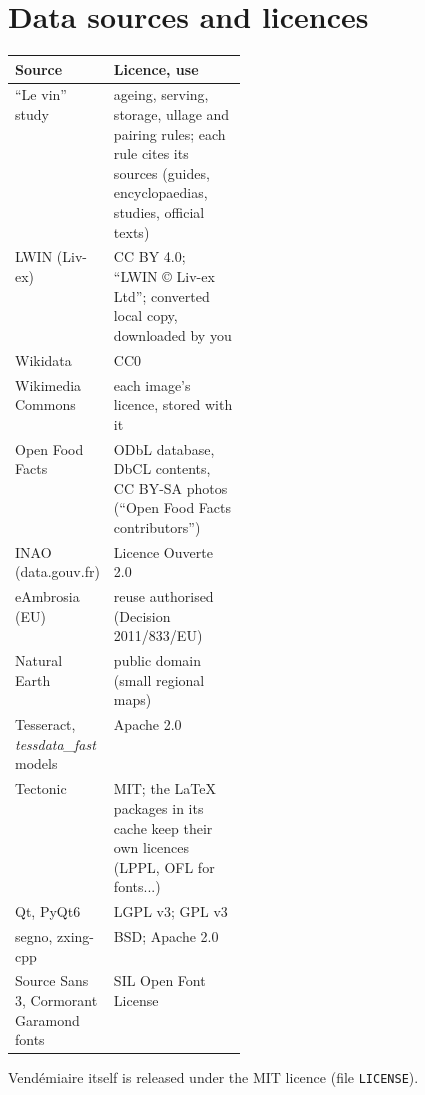 \documentclass[11pt,a4paper]{article}
\begin{document}
\section{Data sources and licences}
\begin{center}
\small
\begin{tabularx}{\linewidth}{>{\raggedright\arraybackslash}p{0.27\linewidth} X}
\toprule
\textbf{Source} & \textbf{Licence, use} \\
\midrule
``Le vin'' study & ageing, serving, storage, ullage and pairing rules; each rule cites its sources (guides,
encyclopaedias, studies, official texts) \\
LWIN (Liv-ex) & CC BY 4.0; ``LWIN © Liv-ex Ltd''; converted local copy, downloaded by you \\
Wikidata & CC0 \\
Wikimedia Commons & each image's licence, stored with it \\
Open Food Facts & ODbL database, DbCL contents, CC BY-SA photos (``Open Food Facts contributors'') \\
INAO (data.gouv.fr) & Licence Ouverte 2.0 \\
eAmbrosia (EU) & reuse authorised (Decision 2011/833/EU) \\
Natural Earth & public domain (small regional maps) \\
Tesseract, \emph{tessdata\_fast} models & Apache 2.0 \\
Tectonic & MIT; the LaTeX packages in its cache keep their own licences (LPPL, OFL for fonts...) \\
Qt, PyQt6 & LGPL v3; GPL v3 \\
segno, zxing-cpp & BSD; Apache 2.0 \\
Source Sans 3, Cormorant Garamond fonts & SIL Open Font License \\
\bottomrule
\end{tabularx}
\end{center}
Vendémiaire itself is released under the MIT licence (file \texttt{LICENSE}).

\end{document}

